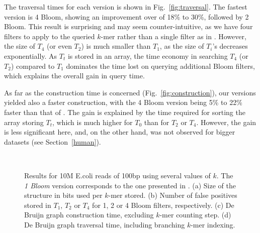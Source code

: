 \documentclass[pdftex]{llncs}\usepackage[T1]{fontenc}
\begin{document}
The traversal times for each version is shown in
Fig.~\ref{fig:traversal}. 
The fastest version is 4 Bloom, showing an improvement over \cite{DBLP:conf/wabi/ChikhiR12} 
of 18\% to 30\%, followed by 2 Bloom. 
This result is surprising and may seem counter-intuitive, as we have
four filters to apply to the queried $k$-mer rather than a single
filter as in \cite{DBLP:conf/wabi/ChikhiR12}. However, the size of
$T_4$ (or even $T_2$) is much smaller than $T_1$, as the size of
$T_i$'s decreases exponentially. As $T_t$ is stored in an array, the time economy in searching $T_4$
(or $T_2$) compared to $T_1$ dominates the time lost on querying
additional Bloom filters, which explains the overall gain in query time. 

As far as the construction time is concerned
(Fig.~\ref{fig:construction}), our versions yielded also a faster
construction, with the 4 Bloom version being 5\% to 22\% faster than
that of \cite{DBLP:conf/wabi/ChikhiR12}. The gain is explained by the
time required for sorting the array storing $T_t$, which is much
higher for $T_0$ than for $T_2$ or $T_4$. However, the gain is less significant
here, and, on the other hand, was not observed for bigger datasets (see
Section~\ref{human}). 


\begin{figure}[Htbp]
  \center
   \\
  \caption{Results for 10M E.coli reads of 100bp using several values
    of $k$. The \emph{1 Bloom} version corresponds to the one
    presented in \cite{DBLP:conf/wabi/ChikhiR12}. (a) Size of the
    structure in bits used per $k$-mer stored. (b)
    Number of false positives stored in $T_1$, $T_2$ or $T_4$ for 1, 2
    or 4 Bloom filters, respectively. (c) De Bruijn graph
    construction time, excluding $k$-mer counting step. (d) De Bruijn
    graph traversal time, including branching $k$-mer indexing. }  \label{fig:ecoli}
\end{figure}
\end{document}
